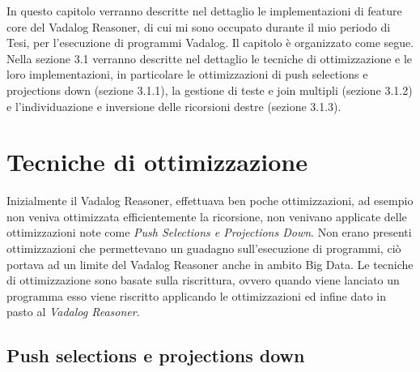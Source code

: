 In questo capitolo verranno descritte nel dettaglio le implementazioni di feature core del Vadalog Reasoner, di cui mi sono occupato durante il mio periodo di Tesi, per l'esecuzione di programmi Vadalog. \newline
Il capitolo è organizzato come segue. Nella sezione 3.1 verranno descritte nel dettaglio le tecniche di ottimizzazione e le loro implementazioni, in particolare le ottimizzazioni di push selections e projections down (sezione 3.1.1), la gestione di teste e join multipli (sezione 3.1.2) e l'individuazione e inversione delle ricorsioni destre (sezione 3.1.3). \newline

\section{Tecniche di ottimizzazione}

Inizialmente il Vadalog Reasoner, effettuava ben poche ottimizzazioni, ad esempio non veniva ottimizzata efficientemente la ricorsione, non venivano applicate delle ottimizzazioni note come \emph{Push Selections e Projections Down}. Non erano presenti ottimizzazioni che permettevano un guadagno sull'esecuzione di programmi, ciò portava ad un limite del Vadalog Reasoner anche in ambito Big Data. \newline
Le tecniche di ottimizzazione sono basate sulla riscrittura, ovvero quando viene lanciato un programma esso viene riscritto applicando le ottimizzazioni ed infine dato in pasto al \emph{Vadalog Reasoner}.

\subsection{Push selections e projections down}

